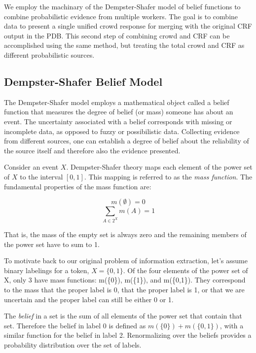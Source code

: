 We employ the machinary of the Dempster-Shafer model of belief functions to combine probabilistic evidence from multiple workers.  The goal is to combine data to present a single unified crowd response for merging with the original CRF output in the PDB.  This second step of combining crowd and CRF can be accomplished using the same method, but treating the total crowd and CRF as different probabilistic sources.

\subsection{Dempster-Shafer Belief Model}
The Dempster-Shafer model \cite{dempster67a, Shafer76} employs a mathematical object called a belief function that measures the degree of belief (or mass) someone has about an event.  The uncertainty associated with a belief corresponds with missing or incomplete data, as opposed to fuzzy or possibilistic data.  Collecting evidence from different sources, one can establish a degree of belief about the reliability of the source itself and therefore also the evidence presented.

Consider an event $X$.  Dempster-Shafer theory maps each element of the power set of $X$ to the interval $[0,1]$.  This mapping is referred to as the \textit{mass function}.  The fundamental properties of the mass function are:

\begin{equation*}
m(\emptyset) = 0
\end{equation*}
\begin{equation*}
\sum_{A\in2^{X}} m(A) = 1
\end{equation*}

That is, the mass of the empty set is always zero and the remaining members of the power set have to sum to 1.

To motivate back to our original problem of information extraction, let's assume binary labelings for a token, $X=\{0,1\}$.  Of the four elements of the power set of X, only 3 have mass functions: m(\{0\}), m(\{1\}), and m(\{0,1\}).  They correspond to the mass that the proper label is 0, that the proper label is 1, or that we are uncertain and the proper label can still be either 0 or 1.

The \textit{belief} in a set is the sum of all elements of the power set that contain that set.  Therefore the belief in label 0 is defined as $m(\{0\})+m(\{0,1\})$, with a similar function for the belief in label 2.  Renormalizing over the beliefs provides a probability distribution over the set of labels.

